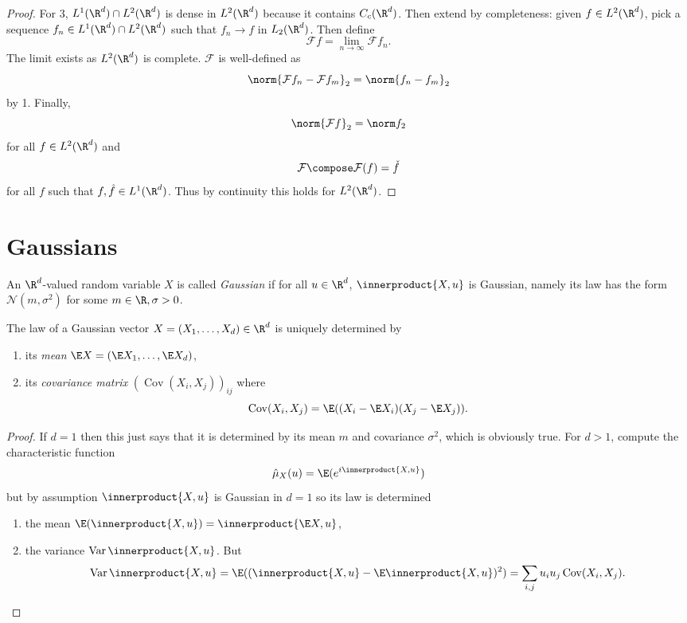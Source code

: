 \documentclass[a4paper]{article}
\DeclareMathOperator{\var}{Var} %
\newcommand*{\ip}{\innerproduct} %
\DeclareMathOperator{\cov}{Cov} %
\begin{document}
\begin{proof}
  For 3, \(L^1(\R^d) \cap L^2(\R^d)\) is dense in \(L^2(\R^d)\) because it contains \(C_c(\R^d)\). Then extend by completeness: given \(f \in L^2(\R^d)\), pick a sequence \(f_n \in L^1(\R^d) \cap L^2(\R^d)\) such that \(f_n \to f\) in \(L_2(\R^d)\). Then define
  \[
    \mathcal F f = \lim_{n \to \infty} \mathcal F f_n.
  \]
  The limit exists as \(L^2(\R^d)\) is complete. \(\mathcal F\) is well-defined as
  \[
    \norm{\mathcal F f_n - \mathcal F f_m}_2 = \norm{f_n - f_m}_2
  \]
  by 1. Finally,
  \[
    \norm{\mathcal F f}_2 = \norm f_2
  \]
  for all \(f \in L^2(\R^d)\) and
  \[
    \mathcal F \compose \mathcal F(f) = \check f
  \]
  for all \(f\) such that \(f, \hat f \in L^1(\R^d)\). Thus by continuity this holds for \(L^2(\R^d)\).
\end{proof}

\section{Gaussians}

\begin{definition}[Gaussian]
  An \(\R^d\)-valued random variable \(X\) is called \emph{Gaussian} if for all \(u \in \R^d\), \(\ip{X, u}\) is Gaussian, namely its law has the form \(\mathcal N(m, \sigma^2)\) for some \(m \in \R, \sigma > 0\).
\end{definition}

\begin{proposition}
  The law of a Gaussian vector \(X = (X_1, \dots, X_d) \in \R^d\) is uniquely determined by
  \begin{enumerate}
  \item its \emph{mean} \(\E X = (\E X_1, \dots, \E X_d)\),
  \item its \emph{covariance matrix} \((\cov(X_i, X_j))_{ij}\) where
    \[
      \cov(X_i, X_j) = \E((X_i - \E X_i) (X_j - \E X_j)).
    \]
  \end{enumerate}
\end{proposition}

\begin{proof}
  If \(d = 1\) then this just says that it is determined by its mean \(m\) and covariance \(\sigma^2\), which is obviously true. For \(d > 1\), compute the characteristic function
  \[
    \hat \mu_X(u) = \E(e^{i \ip{X, u}})
  \]
  but by assumption \(\ip{X, u}\) is Gaussian in \(d = 1\) so its law is determined
  \begin{enumerate}
  \item the mean \(\E(\ip{X, u}) = \ip{\E X, u}\),
  \item the variance \(\var \ip{X, u}\). But
    \[
      \var \ip{X, u}
      = \E((\ip{X, u} - \E \ip{X, u})^2)
      = \sum_{i, j} u_iu_j \cov (X_i, X_j).
    \]
  \end{enumerate}
\end{proof}
\end{document}
